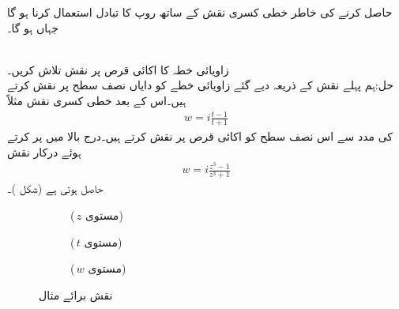  حاصل کرنے کی خاطر خطی کسری نقش کے ساتھ  روپ کا   تبادل استعمال کرنا ہو گا جہاں  ہو گا۔

\quad {}\\
زاویائی خطہ  کا اکائی قرص  پر نقش تلاش کریں۔\\
حل:\quad ہم پہلے نقش  کے ذریعہ دیے گئے زاویائی خطے  کو دایاں نصف  سطح پر نقش کرتے ہیں۔اس کے بعد خطی کسری نقش مثلاً
\begin{align*}
w=i\frac{t-1}{t+1}
\end{align*}
 کی مدد سے اس نصف سطح کو اکائی قرص پر نقش کرتے ہیں۔درج بالا میں  پر کرتے ہوئے درکار نقش
\begin{align*}
w=i\frac{z^3-1}{z^3+1}
\end{align*}
حاصل ہوتی ہے (شکل )۔
\begin{figure}
\centering
\begin{subfigure}{0.3\textwidth}
\centering
{}
\caption*{($\,z$ مستوی)}
\end{subfigure}\hfill
\begin{subfigure}{0.3\textwidth}
\centering
{}
\caption*{($\,t$ مستوی)}
\end{subfigure}\hfill
\begin{subfigure}{0.3\textwidth}
\centering
{}
\caption*{($\,w$ مستوی)}
\end{subfigure}
\caption{نقش برائے مثال }
\label{شکل_مثال_نقش_زاویائی_کو_قرص_پر}
\end{figure}


